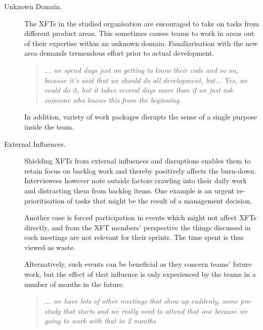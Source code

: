\begin{description}
    \item [Unknown Domain.] The \acp{XFT} in the studied organisation are encouraged to take on tasks from different product areas. This sometimes causes teams to work in areas out of their expertise within an unknown domain. Familiarisation with the new area demands tremendous effort prior to actual development.

      \begin{quote}\itshape ... we spend days just on getting to know their code and so on, because it's said that we should do all development, but... Yes, we could do it, but it takes several days more than if we just ask someone who knows this from the beginning.
      \end{quote}

   In addition, variety of work packages disrupts the sense of a single purpose inside the team.

   \item [External Influences.] Shielding \acp{XFT} from external influences and disruptions enables them to retain focus on backlog work and thereby positively affects the burn-down. Interviewees however note outside factors crawling into their daily work and distracting them from backlog items. One example is an urgent re-prioritisation of tasks that might be the result of a management decision.
    

   Another case is forced participation in events which might not affect \acp{XFT} directly, and from the XFT members' perspective the things discussed in such meetings are not relevant for their sprints. The time spent is thus viewed as waste.


   Alternatively, such events can be beneficial as they concern teams' future work, but the effect of that influence is only experienced by the teams in a number of months in the future.

      \begin{quote}\itshape ... we have lots of other meetings that show up suddenly, some pre-study that starts and we really need to attend that one because we going to work with that in 2 months
      \end{quote}


\end{description}
